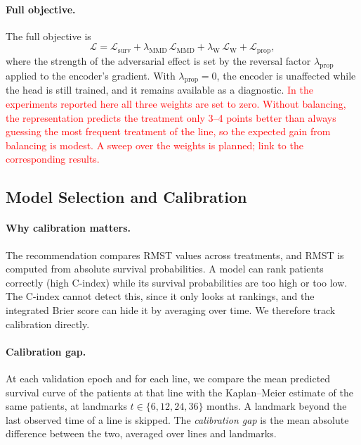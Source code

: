 \documentclass[a4paper,10pt]{article}
\newcommand{\todo}[1]{\textcolor{red}{#1}}
\begin{document}
\paragraph{Full objective.} The full objective is
\begin{equation}
    \mathcal{L} = \mathcal{L}_{\text{surv}} + \lambda_{\text{MMD}}\, \mathcal{L}_{\text{MMD}} + \lambda_{\text{W}}\, \mathcal{L}_{\text{W}} + \mathcal{L}_{\text{prop}},
\end{equation}
where the strength of the adversarial effect is set by the reversal factor $\lambda_{\text{prop}}$ applied to the encoder's gradient. With $\lambda_{\text{prop}} = 0$, the encoder is unaffected while the head is still trained, and it remains available as a diagnostic. \todo{In the experiments reported here all three weights are set to zero. Without balancing, the representation predicts the treatment only 3--4 points better than always guessing the most frequent treatment of the line, so the expected gain from balancing is modest. A sweep over the weights is planned; link to the corresponding results.}

\subsection{Model Selection and Calibration}
\label{sec:calibration}

\paragraph{Why calibration matters.} The recommendation compares RMST values across treatments, and RMST is computed from absolute survival probabilities. A model can rank patients correctly (high C-index) while its survival probabilities are too high or too low. The C-index cannot detect this, since it only looks at rankings, and the integrated Brier score can hide it by averaging over time. We therefore track calibration directly.

\paragraph{Calibration gap.} At each validation epoch and for each line, we compare the mean predicted survival curve of the patients at that line with the Kaplan--Meier estimate of the same patients, at landmarks $t \in \{6, 12, 24, 36\}$ months. A landmark beyond the last observed time of a line is skipped. The \emph{calibration gap} is the mean absolute difference between the two, averaged over lines and landmarks.
\end{document}
